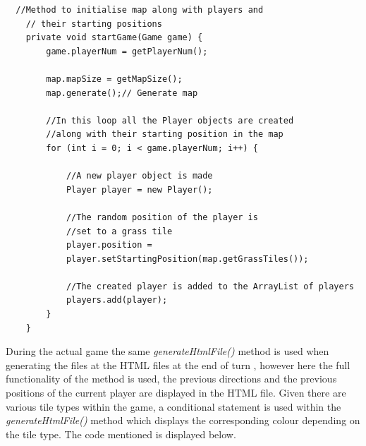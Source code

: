 \documentclass[a4paper,12pt]{extarticle}
\begin{document}
\newpage
\begin{lstlisting}
  //Method to initialise map along with players and
    // their starting positions
    private void startGame(Game game) {
        game.playerNum = getPlayerNum();

        map.mapSize = getMapSize();
        map.generate();// Generate map

        //In this loop all the Player objects are created 
        //along with their starting position in the map
        for (int i = 0; i < game.playerNum; i++) {

            //A new player object is made
            Player player = new Player();

            //The random position of the player is 
            //set to a grass tile
            player.position = 
            player.setStartingPosition(map.getGrassTiles());

            //The created player is added to the ArrayList of players
            players.add(player);
        }
    }
\end{lstlisting}
\vspace{4mm}

\noindent During the actual game the same \textit{generateHtmlFile()} method is used when generating the files at the HTML files at the end of turn , however here the full functionality of the method is used, the previous directions and the previous positions of the current player are displayed in the HTML file. Given there are various tile types within the game, a conditional statement is used within the \textit{generateHtmlFile()} method which displays the corresponding colour depending on the tile type. The code mentioned is displayed below.
\end{document}
